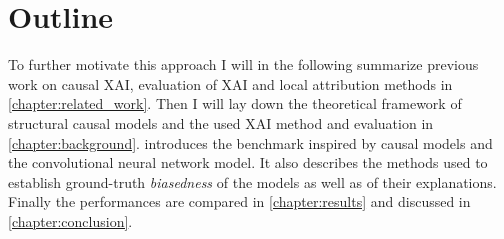 \section{Outline}
To further motivate this approach I will in the following summarize previous work on causal XAI, evaluation of XAI and local attribution methods in \cref{chapter:related_work}. Then I will lay down the theoretical framework of structural causal models and the used XAI method and evaluation in \cref{chapter:background}.  introduces the benchmark inspired by causal models and the convolutional neural network model. It also describes the methods used to establish ground-truth \textit{biasedness} of the models as well as of their explanations. Finally the performances are compared in \cref{chapter:results} and discussed in \cref{chapter:conclusion}.
